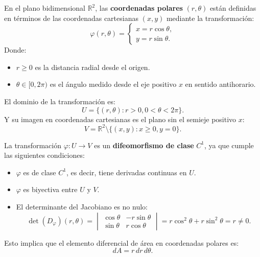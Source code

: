 \begin{definición}
En el plano bidimensional $\mathbb{R}^2$, las \textbf{coordenadas polares} $(r, \theta)$ están definidas en términos de las coordenadas cartesianas $(x, y)$ mediante la transformación:
$$
    \varphi(r, \theta) =
    \begin{cases}
        x = r\cos\theta, \\
        y = r\sin\theta.
    \end{cases}
$$
Donde:
\begin{itemize}
    \item $r \geq 0$ es la distancia radial desde el origen.
    \item $\theta \in [0, 2\pi)$ es el ángulo medido desde el eje positivo $x$ en sentido antihorario.
\end{itemize}

El dominio de la transformación es: $$ U = \{(r, \theta) : r > 0, 0 < \theta <
    2\pi\}. $$ Y su imagen en coordenadas cartesianas es el plano sin el semieje
positivo $x$: $$ V = \mathbb{R}^2 \setminus \{ (x,y) : x \geq 0, y = 0\}. $$

La transformación $\varphi: U \to V$ es un \textbf{difeomorfismo de clase}
$C^1$, ya que cumple las siguientes condiciones:
\begin{itemize}
    \item $\varphi$ es de clase $C^1$, es decir, tiene derivadas continuas en $U$.
    \item $\varphi$ es biyectiva entre $U$ y $V$.
    \item El determinante del Jacobiano es no nulo: $$ \det(D_{\varphi})(r, \theta) =
              \begin{vmatrix}
                  \cos\theta & -r\sin\theta \\
                  \sin\theta & r\cos\theta
              \end{vmatrix} = r\cos^2\theta + r\sin^2\theta = r \neq 0.
          $$
\end{itemize}
Esto implica que el elemento diferencial de área en coordenadas polares es:
$$
    dA = r \, dr \, d\theta.
$$
\end{definición}

